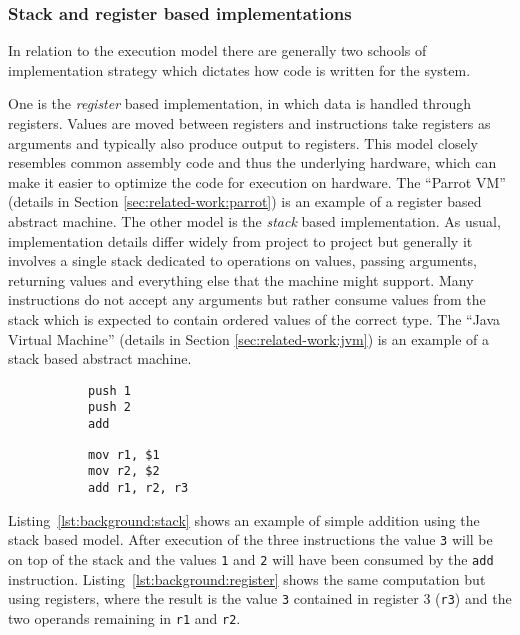\subsubsection{Stack and register based implementations}

In relation to the execution model there are generally two schools of
implementation strategy which dictates how code is written for the system.

One is the \textit{register} based implementation, in which data is handled
through registers. Values are moved between registers and instructions take
registers as arguments and typically also produce output to registers. This
model closely resembles common assembly code and thus the underlying hardware,
which can make it easier to optimize the code for execution on hardware. The
``Parrot VM'' (details in Section \ref{sec:related-work:parrot}) is an example
of a register based abstract machine. The other model is the \textit{stack}
based implementation. As usual, implementation details differ widely from
project to project but generally it involves a single stack dedicated to
operations on values, passing arguments, returning values and everything else
that the machine might support. Many instructions do not accept any arguments
but rather consume values from the stack which is expected to contain ordered
values of the correct type. The ``Java Virtual Machine'' (details in Section
\ref{sec:related-work:jvm}) is an example of a stack based abstract machine.

\begin{figure}[h]
  \centering
  \begin{subfigure}[t]{.45\textwidth}
    \begin{lstlisting}[label={lst:background:stack}, caption=Stack based addition]
push 1
push 2
add
    \end{lstlisting}
  \end{subfigure}
  \begin{subfigure}[t]{.45\textwidth}
    \begin{lstlisting}[label={lst:background:register}, caption=Register based addition]
mov r1, $1
mov r2, $2
add r1, r2, r3
    \end{lstlisting}
  \end{subfigure}
\end{figure}

Listing~\ref{lst:background:stack} shows an example of simple addition using the
stack based model. After execution of the three instructions the value
\texttt{3} will be on top of the stack and the values \texttt{1} and \texttt{2}
will have been consumed by the \texttt{add}
instruction. Listing~\ref{lst:background:register} shows the same computation
but using registers, where the result is the value \texttt{3} contained in
register 3 (\texttt{r3}) and the two operands remaining in \texttt{r1} and
\texttt{r2}.

